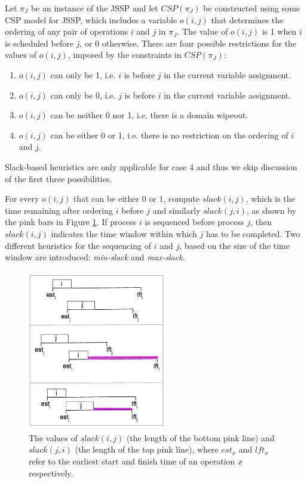 \documentclass{mprop}
\theoremstyle{definition}
\begin{document}
Let $\pi_{J}$ be an instance of the JSSP and let $CSP(\pi_{J})$ be constructed using some CSP model for JSSP, which includes a variable $o(i,j)$ that determines the ordering of any pair of operations $i$ and $j$ in $\pi_{J}$. The value of $o(i,j)$ is 1 when $i$ is scheduled before $j$, or 0 otherwise. There are four possible restrictions for the values of $o(i,j)$, imposed by the constraints in $CSP(\pi_{J})$:

\begin{enumerate}
\item $o(i,j)$ can only be 1, i.e. $i$ is before $j$ in the current variable assignment.
\item $o(i,j)$ can only be 0, i.e. $j$ is before $i$ in the current variable assignment.
\item $o(i,j)$ can be neither 0 nor 1, i.e. there is a domain wipeout.
\item $o(i,j)$ can be either 0 or 1, i.e. there is no restriction on the ordering of $i$ and $j$.
\end{enumerate}
Slack-based heuristics are only applicable for case 4 and thus we skip discussion of the first three possibilities.

For every $o(i,j)$ that can be either 0 or 1, \citet{Smith93} compute $slack(i, j)$, which is the time remaining after ordering $i$ before $j$ and similarly $slack(j, i)$, as shown by the pink bars in Figure \ref{fig:slack}. If process $i$ is sequenced before process $j$, then $slack(i, j)$ indicates the time window within which $j$ has to be completed.
Two different heuristics for the sequencing of $i$ and $j$, based on the size of the time window are introduced: \textit{min-slack} and \textit{max-slack}.

\begin{figure}[H]
\centering
\includegraphics[height=7cm, width=6cm]{images/slack.png}
\caption{The values of $slack(i, j)$ (the length of the bottom pink line) and $slack(j, i)$ (the length of the top pink line), where $est_{x}$ and $lft_{x}$ refer to the earliest start and finish time of an operation $x$ respectively.}
\label{fig:slack}
\end{figure}
\end{document}
